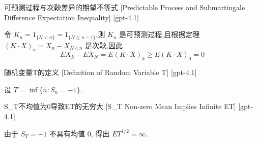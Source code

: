 \documentclass[UTF8]{ctexart}
\begin{document}
    
    
    \begin{thm}
        {可预测过程与次鞅差异的期望不等式}
        [Predictable Process and Submartingale Difference Expectation Inequality]
        [gpt-4.1]
        
令 $K_n = 1_{\{N < n\}} = 1_{\{N \leq n - 1\}}$,则 $K_n$ 是可预测过程,且根据定理 $(K \cdot X)_n = X_n - X_{N \wedge n}$ 是次鞅,因此
\[
E X_k - E X_N = E (K \cdot X)_k \geq E (K \cdot X)_0 = 0
\]

    \end{thm}
    
    
    
    \begin{dfn}
        {随机变量T的定义}
        [Definition of Random Variable T]
        [gpt-4.1]
        
设 $T = \operatorname* { inf } \{ n : S _ { n } = - 1 \}$.

    \end{dfn}
    
    
    
    \begin{crl}
        {S\_T不均值为0导致ET的无穷大}
        [S_T Non-zero Mean Implies Infinite ET]
        [gpt-4.1]
        
由于 $S _ { T } = - 1$ 不具有均值 0, 得出 $E T ^ { 1 / 2 } = \infty$.

    \end{crl}
    
    
    
\end{document}
